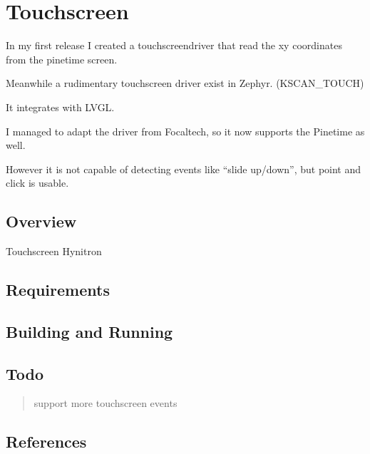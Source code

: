 \documentclass[letterpaper,10pt,english]{sphinxmanual}
\begin{document}
\section{Touchscreen}
\label{\detokenize{behind/touchscreen:touchscreen}}\label{\detokenize{behind/touchscreen::doc}}
In my first release I created a touchscreendriver that read the x\sphinxhyphen{}y coordinates from the pinetime screen.

Meanwhile a rudimentary touchscreen driver exist in Zephyr. (KSCAN\_TOUCH)

It integrates with LVGL.

I managed to adapt the driver from Focaltech, so it now supports the Pinetime as well.

However it is not capable of detecting events like “slide up/down”, but point and click is usable.


\subsection{Overview}
\label{\detokenize{behind/touchscreen:overview}}
Touchscreen Hynitron


\subsection{Requirements}
\label{\detokenize{behind/touchscreen:requirements}}

\subsection{Building and Running}
\label{\detokenize{behind/touchscreen:building-and-running}}

\subsection{Todo}
\label{\detokenize{behind/touchscreen:todo}}\begin{quote}

\sphinxhyphen{}support more touchscreen events
\end{quote}


\subsection{References}
\label{\detokenize{behind/touchscreen:references}}
\end{document}
